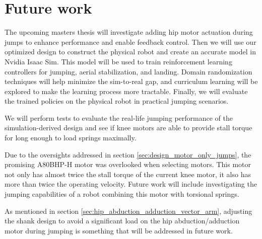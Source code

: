 \section{Future work}
\label{sec:future_work}
The upcoming masters thesis will investigate adding hip motor actuation during jumps to enhance performance and enable feedback control. Then we will use our optimized design to construct the physical robot and create an accurate model in Nvidia Isaac Sim. This model will be used to train reinforcement learning controllers for jumping, aerial stabilization, and landing. Domain randomization techniques will help minimize the sim-to-real gap, and curriculum learning will be explored to make the learning process more tractable. Finally, we will evaluate the trained policies on the physical robot in practical jumping scenarios.

We will perform tests to evaluate the real-life jumping performance of the simulation-derived design and see if knee motors are able to provide stall torque for long enough to load springs maximally.

Due to the oversights addressed in section \ref{sec:design_motor_only_jumps}, the promising A80BHP-H motor was overlooked when selecting motors. This motor not only has almost twice the stall torque of the current knee motor, it also has more than twice the operating velocity. Future work will include investigating the jumping capabilities of a robot combining this motor with torsional springs.

As mentioned in section \ref{sec:hip_abduction_adduction_vector_arm}, adjusting the shank design to avoid a significant load on the hip abduction/adduction motor during jumping is something that will be addressed in future work. 